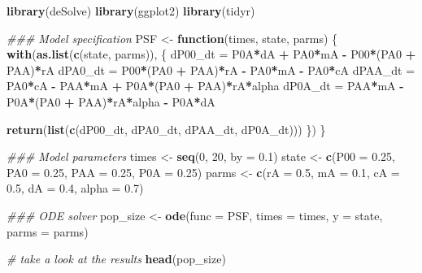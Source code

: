 \documentclass[
]{book}
\newenvironment{Shaded}{\begin{snugshade}}{\end{snugshade}}
\newcommand{\CommentTok}[1]{\textcolor[rgb]{0.56,0.35,0.01}{\textit{#1}}}
\newcommand{\ControlFlowTok}[1]{\textcolor[rgb]{0.13,0.29,0.53}{\textbf{#1}}}
\newcommand{\DataTypeTok}[1]{\textcolor[rgb]{0.13,0.29,0.53}{#1}}
\newcommand{\DecValTok}[1]{\textcolor[rgb]{0.00,0.00,0.81}{#1}}
\newcommand{\FloatTok}[1]{\textcolor[rgb]{0.00,0.00,0.81}{#1}}
\newcommand{\KeywordTok}[1]{\textcolor[rgb]{0.13,0.29,0.53}{\textbf{#1}}}
\newcommand{\NormalTok}[1]{#1}
\newcommand{\OperatorTok}[1]{\textcolor[rgb]{0.81,0.36,0.00}{\textbf{#1}}}
\newcommand{\StringTok}[1]{\textcolor[rgb]{0.31,0.60,0.02}{#1}}
\begin{document}
\begin{Shaded}
\begin{Highlighting}[]
\KeywordTok{library}\NormalTok{(deSolve)}
\KeywordTok{library}\NormalTok{(ggplot2)}
\KeywordTok{library}\NormalTok{(tidyr)}


\CommentTok{### Model specification}
\NormalTok{PSF <-}\StringTok{ }\ControlFlowTok{function}\NormalTok{(times, state, parms) \{}
  \KeywordTok{with}\NormalTok{(}\KeywordTok{as.list}\NormalTok{(}\KeywordTok{c}\NormalTok{(state, parms)), \{}
\NormalTok{    dP00_dt =}\StringTok{ }\NormalTok{P0A}\OperatorTok{*}\NormalTok{dA }\OperatorTok{+}\StringTok{ }\NormalTok{PA0}\OperatorTok{*}\NormalTok{mA }\OperatorTok{-}\StringTok{ }\NormalTok{P00}\OperatorTok{*}\NormalTok{(PA0 }\OperatorTok{+}\StringTok{ }\NormalTok{PAA)}\OperatorTok{*}\NormalTok{rA}
\NormalTok{    dPA0_dt =}\StringTok{ }\NormalTok{P00}\OperatorTok{*}\NormalTok{(PA0 }\OperatorTok{+}\StringTok{ }\NormalTok{PAA)}\OperatorTok{*}\NormalTok{rA }\OperatorTok{-}\StringTok{ }\NormalTok{PA0}\OperatorTok{*}\NormalTok{mA }\OperatorTok{-}\StringTok{ }\NormalTok{PA0}\OperatorTok{*}\NormalTok{cA}
\NormalTok{    dPAA_dt =}\StringTok{ }\NormalTok{PA0}\OperatorTok{*}\NormalTok{cA }\OperatorTok{-}\StringTok{ }\NormalTok{PAA}\OperatorTok{*}\NormalTok{mA }\OperatorTok{+}\StringTok{ }\NormalTok{P0A}\OperatorTok{*}\NormalTok{(PA0 }\OperatorTok{+}\StringTok{ }\NormalTok{PAA)}\OperatorTok{*}\NormalTok{rA}\OperatorTok{*}\NormalTok{alpha}
\NormalTok{    dP0A_dt =}\StringTok{ }\NormalTok{PAA}\OperatorTok{*}\NormalTok{mA }\OperatorTok{-}\StringTok{ }\NormalTok{P0A}\OperatorTok{*}\NormalTok{(PA0 }\OperatorTok{+}\StringTok{ }\NormalTok{PAA)}\OperatorTok{*}\NormalTok{rA}\OperatorTok{*}\NormalTok{alpha }\OperatorTok{-}\StringTok{ }\NormalTok{P0A}\OperatorTok{*}\NormalTok{dA}

    \KeywordTok{return}\NormalTok{(}\KeywordTok{list}\NormalTok{(}\KeywordTok{c}\NormalTok{(dP00_dt, dPA0_dt, dPAA_dt, dP0A_dt)))}
\NormalTok{  \})}
\NormalTok{\}}

\CommentTok{### Model parameters}
\NormalTok{times <-}\StringTok{ }\KeywordTok{seq}\NormalTok{(}\DecValTok{0}\NormalTok{, }\DecValTok{20}\NormalTok{, }\DataTypeTok{by =} \FloatTok{0.1}\NormalTok{)}
\NormalTok{state <-}\StringTok{ }\KeywordTok{c}\NormalTok{(}\DataTypeTok{P00 =} \FloatTok{0.25}\NormalTok{, }\DataTypeTok{PA0 =} \FloatTok{0.25}\NormalTok{, }\DataTypeTok{PAA =} \FloatTok{0.25}\NormalTok{, }\DataTypeTok{P0A =} \FloatTok{0.25}\NormalTok{)}
\NormalTok{parms <-}\StringTok{ }\KeywordTok{c}\NormalTok{(}\DataTypeTok{rA =} \FloatTok{0.5}\NormalTok{, }\DataTypeTok{mA =} \FloatTok{0.1}\NormalTok{, }\DataTypeTok{cA =} \FloatTok{0.5}\NormalTok{, }\DataTypeTok{dA =} \FloatTok{0.4}\NormalTok{, }\DataTypeTok{alpha =} \FloatTok{0.7}\NormalTok{)}

\CommentTok{### ODE solver}
\NormalTok{pop_size <-}\StringTok{ }\KeywordTok{ode}\NormalTok{(}\DataTypeTok{func =}\NormalTok{ PSF, }\DataTypeTok{times =}\NormalTok{ times, }\DataTypeTok{y =}\NormalTok{ state, }\DataTypeTok{parms =}\NormalTok{ parms)}

\CommentTok{# take a look at the results}
\KeywordTok{head}\NormalTok{(pop_size)}
\end{Highlighting}
\end{Shaded}
\end{document}
